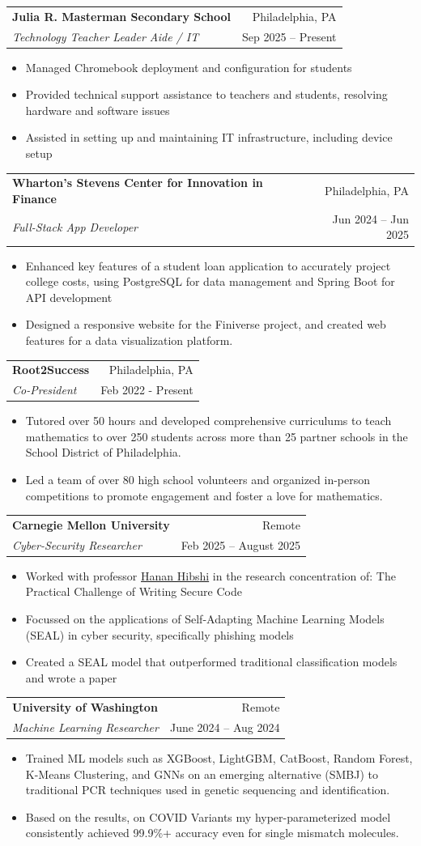 \documentclass[letterpaper,11pt]{article}
\makeatletter
\newcommand{\resumeItem}[1]{
  \item\small{
    {#1 \vspace{-2pt}}
  }
}
\newcommand{\resumeSubheading}[4]{
  \vspace{-2pt}\item
    \begin{tabular*}{0.97\textwidth}[t]{l@{\extracolsep{\fill}}r}
      \textbf{\small#1} & \small#2 \\
      \textit{\small#3} & \textrm{\small #4} \\
    \end{tabular*}\vspace{-7pt}
}
\newcommand{\resumeItemListStart}{\begin{itemize}}
\newcommand{\resumeItemListEnd}{\end{itemize}\vspace{-5pt}}
\makeatother
\begin{document}
    \resumeSubheading
      {Julia R. Masterman Secondary School}{Philadelphia, PA}
      {Technology Teacher Leader Aide / IT}{Sep 2025 -- Present}
      \resumeItemListStart
        \resumeItem{Managed Chromebook deployment and configuration for students}
        \resumeItem{Provided technical support assistance to teachers and students, resolving hardware and software issues}
        \resumeItem{Assisted in setting up and maintaining IT infrastructure, including device setup}
      \resumeItemListEnd
      
    \resumeSubheading
      {Wharton's Stevens Center for Innovation in Finance}{Philadelphia, PA}
      {Full-Stack App Developer}{Jun 2024 -- Jun 2025}
      \resumeItemListStart
        \resumeItem{Enhanced key features of a student loan application to accurately project college costs, using PostgreSQL for data management and Spring Boot for API development}
        \resumeItem{Designed a responsive website for the Finiverse project, and created web features for a data visualization platform.}
      \resumeItemListEnd

    \resumeSubheading
      {Root2Success}{Philadelphia, PA}
      {Co-President}{Feb 2022 - Present}
      \resumeItemListStart
        \resumeItem{Tutored over 50 hours and developed comprehensive curriculums to teach mathematics to over 250 students across more than 25 partner schools in the School District of Philadelphia.}
        \resumeItem{Led a team of over 80 high school volunteers and organized in-person competitions to promote engagement and foster a love for mathematics.}
      \resumeItemListEnd
    
    \resumeSubheading
      {Carnegie Mellon University}{Remote}
      {Cyber-Security Researcher}{Feb 2025 -- August 2025}
      \resumeItemListStart
        \resumeItem{Worked with professor \href{https://www.cmu.edu/ini/news/2025/faculty-spotlight-hanan-hibshi.html}{Hanan Hibshi} in the research concentration of: The Practical Challenge of Writing Secure Code}
        \resumeItem{Focussed on the applications of Self-Adapting Machine Learning Models (SEAL) in cyber security, specifically phishing models}
        \resumeItem{Created a SEAL model that outperformed traditional classification models and wrote a paper}
    \resumeItemListEnd
    
    \resumeSubheading
      {University of Washington}{Remote}
      {Machine Learning Researcher}{June 2024 -- Aug 2024}
      \resumeItemListStart
        \resumeItem{Trained ML models such as XGBoost, LightGBM, CatBoost, Random Forest, K-Means Clustering, and GNNs on an emerging alternative (SMBJ) to traditional PCR techniques used in genetic sequencing and identification.}
        \resumeItem{Based on the results, on COVID Variants my hyper-parameterized model consistently achieved 99.9\%+ accuracy even for single mismatch molecules.}
    \resumeItemListEnd
      
\end{document}
